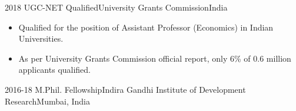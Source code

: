 %
%
%


\begin{achievments}

  \experience
    {2018}   {UGC-NET Qualified}{University Grants Commission}{India}
    {} {
                      \begin{itemize}
                        \item Qualified for the position of Assistant Professor (Economics) in Indian Universities.
                        \item As per University Grants Commission official report, only 6\% of 0.6 million applicants qualified.
                      \end{itemize}
                    }
\emptySeparator
  \experience
    {2016-18}   {M.Phil. Fellowship}{Indira Gandhi Institute of Development Research}{Mumbai, India}
    {} {}
\end{achievments}